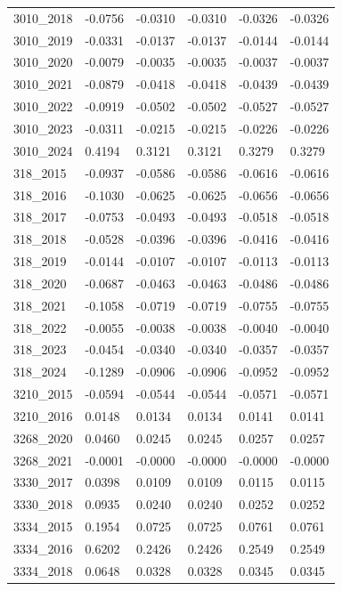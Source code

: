 \begin{table}[htbp]
\begin{tabular}{llllll}
3010_2018 & -0.0756 & -0.0310 & -0.0310 & -0.0326 & -0.0326 \\
3010_2019 & -0.0331 & -0.0137 & -0.0137 & -0.0144 & -0.0144 \\
3010_2020 & -0.0079 & -0.0035 & -0.0035 & -0.0037 & -0.0037 \\
3010_2021 & -0.0879 & -0.0418 & -0.0418 & -0.0439 & -0.0439 \\
3010_2022 & -0.0919 & -0.0502 & -0.0502 & -0.0527 & -0.0527 \\
3010_2023 & -0.0311 & -0.0215 & -0.0215 & -0.0226 & -0.0226 \\
3010_2024 & 0.4194 & 0.3121 & 0.3121 & 0.3279 & 0.3279 \\
318_2015 & -0.0937 & -0.0586 & -0.0586 & -0.0616 & -0.0616 \\
318_2016 & -0.1030 & -0.0625 & -0.0625 & -0.0656 & -0.0656 \\
318_2017 & -0.0753 & -0.0493 & -0.0493 & -0.0518 & -0.0518 \\
318_2018 & -0.0528 & -0.0396 & -0.0396 & -0.0416 & -0.0416 \\
318_2019 & -0.0144 & -0.0107 & -0.0107 & -0.0113 & -0.0113 \\
318_2020 & -0.0687 & -0.0463 & -0.0463 & -0.0486 & -0.0486 \\
318_2021 & -0.1058 & -0.0719 & -0.0719 & -0.0755 & -0.0755 \\
318_2022 & -0.0055 & -0.0038 & -0.0038 & -0.0040 & -0.0040 \\
318_2023 & -0.0454 & -0.0340 & -0.0340 & -0.0357 & -0.0357 \\
318_2024 & -0.1289 & -0.0906 & -0.0906 & -0.0952 & -0.0952 \\
3210_2015 & -0.0594 & -0.0544 & -0.0544 & -0.0571 & -0.0571 \\
3210_2016 & 0.0148 & 0.0134 & 0.0134 & 0.0141 & 0.0141 \\
3268_2020 & 0.0460 & 0.0245 & 0.0245 & 0.0257 & 0.0257 \\
3268_2021 & -0.0001 & -0.0000 & -0.0000 & -0.0000 & -0.0000 \\
3330_2017 & 0.0398 & 0.0109 & 0.0109 & 0.0115 & 0.0115 \\
3330_2018 & 0.0935 & 0.0240 & 0.0240 & 0.0252 & 0.0252 \\
3334_2015 & 0.1954 & 0.0725 & 0.0725 & 0.0761 & 0.0761 \\
3334_2016 & 0.6202 & 0.2426 & 0.2426 & 0.2549 & 0.2549 \\
3334_2018 & 0.0648 & 0.0328 & 0.0328 & 0.0345 & 0.0345 \\

\end{tabular}
\end{table}
